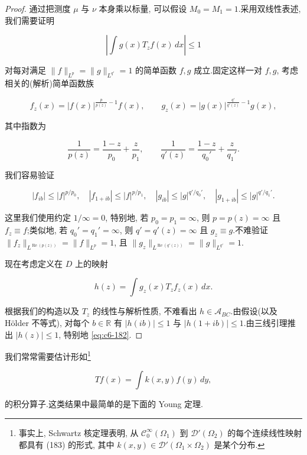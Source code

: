 \begin{proof}
通过把测度 $\mu$ 与 $\nu$ 本身乘以标量, 可以假设 $M_0 = M_1 = 1$.采用双线性表述, 我们需要证明

\begin{equation}
\left|\int g(x)T_z f(x)\, dx\right| \le 1\label{eq:c6-182}
\end{equation}

对每对满足 $\|f\|_{L^p} = \|g\|_{L^{q'}} = 1$ 的简单函数 $f, g$ 成立.固定这样一对 $f, g$, 考虑相关的(解析)简单函数族

\[
f_z(x) = |f(x)|^{\frac{p}{p(z)}-1}f(x), \qquad g_z(x) = |g(x)|^{\frac{q'}{q'(z)}-1}g(x),
\]

其中指数为

\[
\frac{1}{p(z)} = \frac{1-z}{p_0} + \frac{z}{p_1}, \qquad \frac{1}{q'(z)} = \frac{1-z}{q_0'} + \frac{z}{q_1'}.
\]

我们容易验证

\[
|f_{ib}| \le |f|^{p/p_0}, \quad |f_{1+ib}| \le |f|^{p/p_1}, \quad |g_{ib}| \le |g|^{q'/q_0'}, \quad |g_{1+ib}| \le |g|^{q'/q_1'}.
\]

这里我们使用约定 $1/\infty = 0$, 特别地, 若 $p_0 = p_1 = \infty$, 则 $p = p(z) = \infty$ 且 $f_z\equiv f$;类似地, 若 $q_0' = q_1' = \infty$, 则 $q' = q'(z) = \infty$ 且 $g_z\equiv g$.不难验证 $\|f_z\|_{L^{\operatorname{Re}(p(z))}} = \|f\|_{L^p} = 1$, 且 $\|g_z\|_{L^{\operatorname{Re}(q'(z))}} = \|g\|_{L^{q'}} = 1$.

现在考虑定义在 $D$ 上的映射

\[
h(z) = \int g_z(x)T_z f_z(x)\, dx.
\]

根据我们的构造以及 $T_z$ 的线性与解析性质, 不难看出 $h\in\mathcal{A}_{BC}$.由假设(以及 Hölder 不等式), 对每个 $b\in\mathbb{R}$ 有 $|h(ib)|\le 1$ 与 $|h(1+ib)|\le 1$.由三线引理推出 $|h(z)|\le 1$, 特别地 \eqref{eq:c6-182}.
\end{proof}


我们常常需要估计形如\footnote{事实上, Schwartz 核定理表明, 从 $\mathcal{C}_0^\infty(\Omega_1)$ 到 $\mathcal{D}'(\Omega_2)$ 的每个连续线性映射都具有 (183) 的形式, 其中 $k(x, y)\in\mathcal{D}'(\Omega_1\times\Omega_2)$ 是某个分布.}

\begin{equation}
Tf(x) = \int k(x, y)f(y)\, dy, \label{eq:c6-183}
\end{equation}

的积分算子.这类结果中最简单的是下面的 Young 定理.

